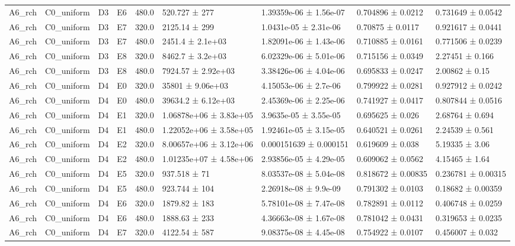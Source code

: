 \begin{table}
\begin{tabular}{lllllllll}
A6\_rch & C0\_uniform & D3 & E6 & 480.0 & 520.727 ± 277 & 1.39359e-06 ± 1.56e-07 & 0.704896 ± 0.0212 & 0.731649 ± 0.0542 \\
A6\_rch & C0\_uniform & D3 & E7 & 320.0 & 2125.14 ± 299 & 1.0431e-05 ± 2.31e-06 & 0.70875 ± 0.0117 & 0.921617 ± 0.0441 \\
A6\_rch & C0\_uniform & D3 & E7 & 480.0 & 2451.4 ± 2.1e+03 & 1.82091e-06 ± 1.43e-06 & 0.710885 ± 0.0161 & 0.771506 ± 0.0239 \\
A6\_rch & C0\_uniform & D3 & E8 & 320.0 & 8462.7 ± 3.2e+03 & 6.02329e-06 ± 5.01e-06 & 0.715156 ± 0.0349 & 2.27451 ± 0.166 \\
A6\_rch & C0\_uniform & D3 & E8 & 480.0 & 7924.57 ± 2.92e+03 & 3.38426e-06 ± 4.04e-06 & 0.695833 ± 0.0247 & 2.00862 ± 0.15 \\
A6\_rch & C0\_uniform & D4 & E0 & 320.0 & 35801 ± 9.06e+03 & 4.15053e-06 ± 2.7e-06 & 0.799922 ± 0.0281 & 0.927912 ± 0.0242 \\
A6\_rch & C0\_uniform & D4 & E0 & 480.0 & 39634.2 ± 6.12e+03 & 2.45369e-06 ± 2.25e-06 & 0.741927 ± 0.0417 & 0.807844 ± 0.0516 \\
A6\_rch & C0\_uniform & D4 & E1 & 320.0 & 1.06878e+06 ± 3.83e+05 & 3.9635e-05 ± 3.55e-05 & 0.695625 ± 0.026 & 2.68764 ± 0.694 \\
A6\_rch & C0\_uniform & D4 & E1 & 480.0 & 1.22052e+06 ± 3.58e+05 & 1.92461e-05 ± 3.15e-05 & 0.640521 ± 0.0261 & 2.24539 ± 0.561 \\
A6\_rch & C0\_uniform & D4 & E2 & 320.0 & 8.00657e+06 ± 3.12e+06 & 0.000151639 ± 0.000151 & 0.619609 ± 0.038 & 5.19335 ± 3.06 \\
A6\_rch & C0\_uniform & D4 & E2 & 480.0 & 1.01235e+07 ± 4.58e+06 & 2.93856e-05 ± 4.29e-05 & 0.609062 ± 0.0562 & 4.15465 ± 1.64 \\
A6\_rch & C0\_uniform & D4 & E5 & 320.0 & 937.518 ± 71 & 8.03537e-08 ± 5.04e-08 & 0.818672 ± 0.00835 & 0.236781 ± 0.00315 \\
A6\_rch & C0\_uniform & D4 & E5 & 480.0 & 923.744 ± 104 & 2.26918e-08 ± 9.9e-09 & 0.791302 ± 0.0103 & 0.18682 ± 0.00359 \\
A6\_rch & C0\_uniform & D4 & E6 & 320.0 & 1879.82 ± 183 & 5.78101e-08 ± 7.47e-08 & 0.782891 ± 0.0112 & 0.406748 ± 0.0259 \\
A6\_rch & C0\_uniform & D4 & E6 & 480.0 & 1888.63 ± 233 & 4.36663e-08 ± 1.67e-08 & 0.781042 ± 0.0431 & 0.319653 ± 0.0235 \\
A6\_rch & C0\_uniform & D4 & E7 & 320.0 & 4122.54 ± 587 & 9.08375e-08 ± 4.45e-08 & 0.754922 ± 0.0107 & 0.456007 ± 0.032 \\

\end{tabular}
\end{table}
